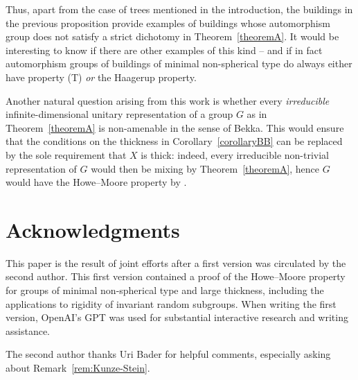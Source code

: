 \documentclass[12pt,a4paper]{amsproc}
\theoremstyle{definition}
\begin{document}
Thus, apart from the  case of trees mentioned in the introduction, the buildings in the previous proposition provide  examples of buildings whose automorphism group does not satisfy a strict dichotomy in Theorem~\ref{theoremA}. It would be interesting to know if there are other examples of this kind -- and if in fact automorphism groups of buildings of minimal non-spherical type do always either have property (T) \emph{or}  the Haagerup property.

Another natural question arising from this work is whether every \textit{irreducible} infinite-dimensional unitary representation of a group $G$ as in Theorem~\ref{theoremA} is non-amenable in the sense of Bekka. This would ensure that the conditions on the thickness in Corollary~\ref{corollaryBB} can be replaced by the sole requirement that $X$ is thick: indeed, every irreducible non-trivial representation of $G$ would then be mixing by Theorem~\ref{theoremA}, hence $G$ would have the Howe--Moore property by \cite[Proposition~2.3.2]{Zimmer1984}. 

\section*{Acknowledgments}

This paper is the result of joint efforts after a first version was circulated by the second author. This first version contained a proof of the Howe--Moore property for groups of minimal non-spherical type and large thickness, including the applications to  rigidity of invariant random subgroups. When writing the first version, OpenAI's GPT was used for substantial interactive research and writing assistance.        

The second author thanks Uri Bader for helpful comments, especially asking about Remark~\ref{rem:Kunze-Stein}.
	
 

\end{document}
